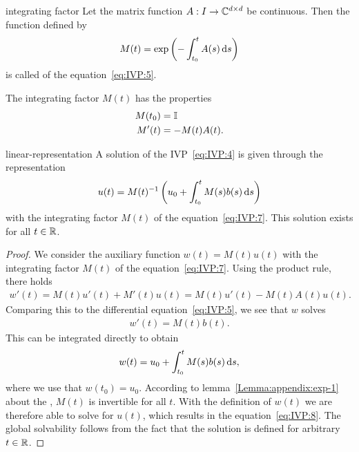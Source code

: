 \begin{Definition}{integrating factor}
    Let the matrix function $A:I\to \mathbb C^{d\times d}$ be continuous.  Then
  the function defined by
  \begin{gather}
    \label{eq:IVP:7}
    M(t) = \exp\left(-\int_{t_0}^t A(s) \,\mathrm{d} s\right)
  \end{gather}
  is called  of the
  equation~\eqref{eq:IVP:5}.
\end{Definition}

\begin{corollary}
  The integrating factor $M(t)$ has the properties
  \begin{align}
    \label{eq:IVP:14}
    M(t_0) &= \mathbb I\\
    \label{eq:IVP:15}
    M'(t) &= -M(t)A(t).
  \end{align}
\end{corollary}

\begin{Lemma}{linear-representation}
  A solution of the IVP~\eqref{eq:IVP:4} is given through the 
  representation
  \begin{gather}
    \label{eq:IVP:8}
    u(t) =  M(t)^{-1}\left(u_0 + \int_{t_0}^t M(s) b(s) \,\mathrm{d} s\right)
  \end{gather}
  with the integrating factor $M(t)$ of the equation~\eqref{eq:IVP:7}.
  This solution exists for all $t\in \mathbb R$.
\end{Lemma}

\begin{proof}
  We consider the auxiliary function $w(t) = M(t) u(t)$ with the
  integrating factor $M(t)$ of the equation~\eqref{eq:IVP:7}. Using the
  product rule, there holds
  \begin{gather}
    \label{eq:IVP:19}
    w'(t) =  M(t) u'(t) + M'(t) u(t)
    =  M(t) u'(t) - M(t)A(t)u(t).
  \end{gather}
  Comparing this to the differential equation~\eqref{eq:IVP:5}, we see
  that $w$ solves
  \begin{gather*}
    w'(t) = M(t) b(t).
  \end{gather*}
	This can be integrated directly to obtain	
  \begin{gather*}
    w(t) = u_0 + \int_{t_0}^t M(s) b(s) \,\mathrm{d} s,
  \end{gather*}
  where we use that $w(t_0) = u_0$.  According to
  lemma~\ref{Lemma:appendix:exp-1} about the , $M(t)$ is invertible for all $t$.  With the
  definition of $w(t)$ we are therefore able to solve for $u(t)$,
  which results in the equation~\eqref{eq:IVP:8}. The global
  solvability follows from the fact that the solution is defined for
  arbitrary $t\in \mathbb R$.
\end{proof}

